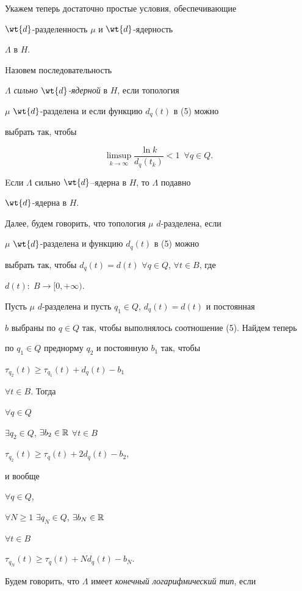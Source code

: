 Укажем теперь достаточно простые условия, обеспечивающие


$\wt{d}$-разделенность $\mu$ и $\wt{d}$-ядер\-ность


$\Lambda$ в $H$.


Hазовем последовательность


$\Lambda$ {\it сильно $\wt{d}$-ядерной} в $H$, если топология


$\mu$\; $\wt{d}$-разделена и если функцию $d_q(t)$ в (5) можно


выбрать так, чтобы


$$


\limsup\limits_{k\to\infty}\frac{\ln k}{d_q(t_k)}


<1\ \; \forall q\in Q.


$$


Eсли $\Lambda$ сильно $\wt{d}$--ядерна в $H$, то $\Lambda$ подавно


$\wt{d}$-ядерна в $H$.


Далее, будем говорить, что топология $\mu$\; $d$-разделена, если


$\mu$\; $\wt{d}$-разделена и функцию $d_q(t)$ в (5) можно


выбрать так, чтобы $d_q(t)=d(t)$ $\forall q\in Q$, $\forall t\in B$, где


$d(t):\;B\to[0,+\infty)$.


Пусть $\mu$\; $d$-разделена и пусть $q_1\in Q$, $d_q(t)=d(t)$ и постоянная


$b$  выбраны по $q\in Q$ так, чтобы выполнялось соотношение (5). Найдем теперь


по $q_1\in Q$ преднорму $q_2$ и постоянную $b_1$ так, чтобы 


$\tau_{q_2}(t)\geqslant \tau_{q_1}(t)+d_q(t)-b_1$


$\forall t\in B$. Тогда 


$\forall q\in Q$


$\exists q_2\in Q$, $\exists b_2\in\Bbb R$ $\forall t\in B$\;


$\tau_{q_2}(t)\geqslant \tau_{q}(t)+2d_q(t)-b_2$,


и вообще


$\forall q\in Q$,


$\forall N\geqslant 1$ $\exists q_N\in Q$, $\exists b_N\in\Bbb R$


$\forall t\in B$\;


$\tau_{q_N}(t)\geqslant \tau_{q}(t)+Nd_q(t)-b_N$.


Будем говорить, что $\Lambda$ имеет {\it конечный логарифмический тип}, если


